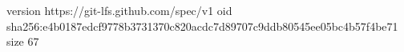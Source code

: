 version https://git-lfs.github.com/spec/v1
oid sha256:e4b0187edcf9778b3731370c820acdc7d89707c9ddb80545ee05bc4b57f4be71
size 67

